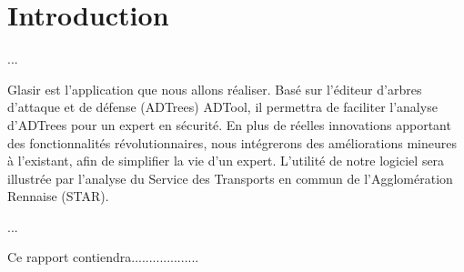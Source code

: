 \section{Introduction}
	\label{sec:intro}

	...

	Glasir est l'application que nous allons réaliser. Basé sur l'éditeur d'arbres d'attaque et de défense (ADTrees) ADTool, il permettra de faciliter l'analyse d'ADTrees pour un expert en sécurité. En plus de réelles innovations apportant des fonctionnalités révolutionnaires, nous intégrerons des améliorations mineures à l'existant, afin de simplifier la vie d'un expert. L'utilité de notre logiciel sera illustrée par l'analyse du Service des Transports en commun de l'Agglomération Rennaise (STAR).

	...

	Ce rapport contiendra...................